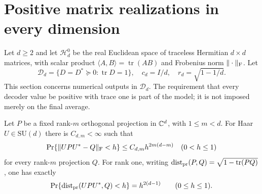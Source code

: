 \section{Positive matrix realizations in every dimension}\label{sec:matrix57}
Let $d\ge2$ and let $\mathcal H_d^0$ be the real Euclidean space of traceless Hermitian $d\times d$ matrices, with scalar product $\langle A,B\rangle=\operatorname{tr}(AB)$ and Frobenius norm $\|\cdot\|_{\rm F}$. Let
\[
 \mathcal D_d=\{D=D^*\succeq0:\operatorname{tr}D=1\},\quad
 c_d=I/d,\quad r_d=\sqrt{1-1/d}.
\]
This section concerns numerical outputs in $\mathcal D_d$. The requirement that every decoder value be positive with trace one is part of the model; it is not imposed merely on the final average.

\begin{lemma}\label{lem:grassmann57}
Let $P$ be a fixed rank-$m$ orthogonal projection in $\mathbb C^d$, with $1\le m<d$. For Haar $U\in\mathrm{SU}(d)$ there is $C_{d,m}<\infty$ such that
\[
 \Pr\{\|UPU^*-Q\|_{\rm F}<h\}\le C_{d,m}h^{2m(d-m)}\quad(0<h\le1)
\]
for every rank-$m$ projection $Q$. For rank one, writing
$\operatorname{dist}_{\rm pr}(P,Q)=\sqrt{1-\operatorname{tr}(PQ)}$, one has exactly
\begin{equation}\label{eq:projectivecap57}
 \Pr\{\operatorname{dist}_{\rm pr}(UPU^*,Q)<h\}=h^{2(d-1)}
                         \qquad(0\le h\le1).
\end{equation}
\end{lemma}
